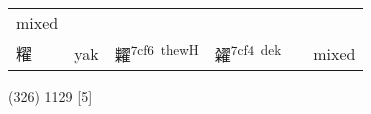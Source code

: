 \documentclass[14pt,a4paper]{scrartcl}
\begin{document}
\begin{longtable}[c]{@{}llllll@{}}
\begin{minipage}[t]{0.14\columnwidth}\raggedright\strut
mixed
\strut\end{minipage}\tabularnewline
\begin{minipage}[t]{0.14\columnwidth}\raggedright\strut
䊮
\strut\end{minipage} &
\begin{minipage}[t]{0.14\columnwidth}\raggedright\strut
yak
\strut\end{minipage} &
\begin{minipage}[t]{0.14\columnwidth}\raggedright\strut
糶\textsuperscript{7cf6~thewH}
\strut\end{minipage} &
\begin{minipage}[t]{0.14\columnwidth}\raggedright\strut
糴\textsuperscript{7cf4~dek}
\strut\end{minipage} &
\begin{minipage}[t]{0.14\columnwidth}\raggedright\strut
\strut\end{minipage} &
\begin{minipage}[t]{0.14\columnwidth}\raggedright\strut
mixed
\strut\end{minipage}\tabularnewline
\bottomrule
\end{longtable}

(326) 1129 {[}5{]}
\end{document}
